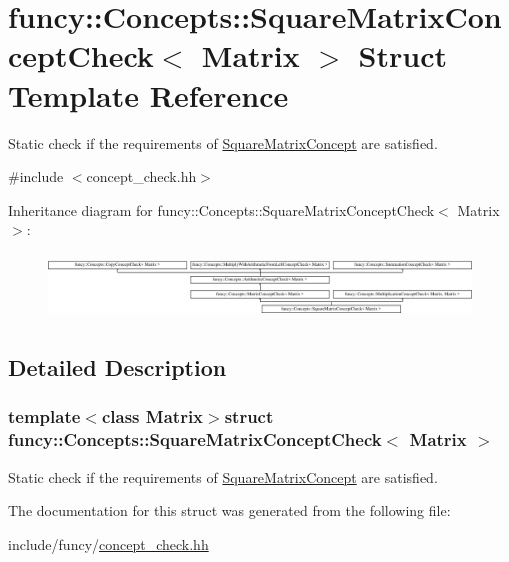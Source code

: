 \hypertarget{structfuncy_1_1Concepts_1_1SquareMatrixConceptCheck}{\section{funcy\-:\-:Concepts\-:\-:Square\-Matrix\-Concept\-Check$<$ Matrix $>$ Struct Template Reference}
\label{structfuncy_1_1Concepts_1_1SquareMatrixConceptCheck}
}


Static check if the requirements of \hyperlink{structfuncy_1_1Concepts_1_1SquareMatrixConcept}{Square\-Matrix\-Concept} are satisfied.  




{\ttfamily \#include $<$concept\-\_\-check.\-hh$>$}

Inheritance diagram for funcy\-:\-:Concepts\-:\-:Square\-Matrix\-Concept\-Check$<$ Matrix $>$\-:\begin{figure}[H]
\begin{center}
\leavevmode
\includegraphics[height=1.724404cm]{structfuncy_1_1Concepts_1_1SquareMatrixConceptCheck}
\end{center}
\end{figure}


\subsection{Detailed Description}
\subsubsection*{template$<$class Matrix$>$struct funcy\-::\-Concepts\-::\-Square\-Matrix\-Concept\-Check$<$ Matrix $>$}

Static check if the requirements of \hyperlink{structfuncy_1_1Concepts_1_1SquareMatrixConcept}{Square\-Matrix\-Concept} are satisfied. 

The documentation for this struct was generated from the following file\-:\begin{DoxyCompactItemize}
\item 
include/funcy/\hyperlink{concept__check_8hh}{concept\-\_\-check.\-hh}\end{DoxyCompactItemize}
